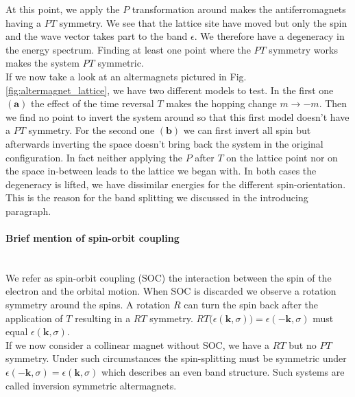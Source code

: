 \documentclass[../main.tex]{main.tex}
\begin{document}
At this point, we apply the $P$ transformation around makes the antiferromagnets having a $PT$ symmetry. We see that the lattice site have moved but only the spin and
the wave vector takes part to the band $\epsilon$. We therefore have a degeneracy in the energy spectrum. Finding at least one point where the $PT$ 
symmetry works makes the system $PT$ symmetric.\\

If we now take a look at an altermagnets pictured in Fig. \ref{fig:altermagnet_lattice}, we have two different models to test. In the first one $\bm{(a)}$
the effect of the time reversal $T$ makes the hopping change $m\rightarrow -m$. Then we find no point
to invert the system around so that this first model doesn't have a $PT$ symmetry. For the second one $\bm{(b)}$
we can first invert all spin but afterwards inverting the space doesn't bring back the system in the original configuration.
In fact neither applying the $P$ after $T$ on the lattice point nor on the space in-between leads to the lattice we began with. In both cases the 
degeneracy is lifted, we have dissimilar energies for the different spin-orientation. This is the reason for the band splitting we discussed in the introducing 
paragraph.\\

\paragraph{Brief mention of spin-orbit coupling} $~$ \\

We refer as spin-orbit coupling (SOC) the interaction between the spin of the electron and the orbital motion. 
When SOC is discarded we observe a rotation symmetry around the spins. A rotation $R$ can turn the spin back after the application of $T$
resulting in a $RT$ symmetry. $RT\bigl(\epsilon(\bm{k},\sigma)\bigr) = \epsilon(-\bm{k},\sigma)$ must equal $\epsilon(\bm{k},\sigma)$.\\

If we now consider a collinear magnet without SOC, we have a $RT$ but no $PT$ symmetry. Under such circumstances the spin-splitting must be symmetric under 
$\epsilon(-\bm{k},\sigma) = \epsilon(\bm{k},\sigma)$ which describes an even band structure. Such systems are called inversion symmetric altermagnets.\\
\end{document}
